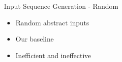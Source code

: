 \documentclass[aspectratio=169, xcolor=table]{beamer}
\begin{document}

\iffalse
\begin{frame}{Input Sequence Generation - Random}
	\vspace{-1.5em}
	\begin{itemize}
		\item Random abstract inputs %
		\pause
		\item Our baseline
		\pause
		\item Inefficient and ineffective
	\end{itemize}
\end{frame}

\end{document}
